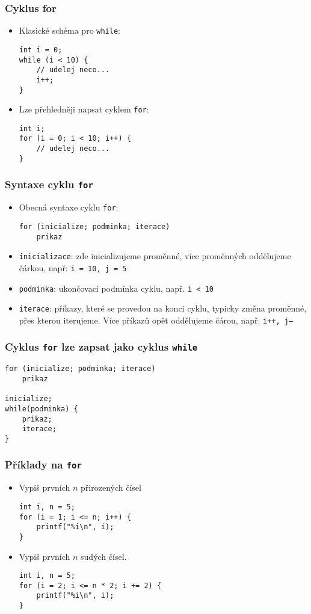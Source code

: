 \documentclass{beamer}
\newenvironment{itemizex}%
  {\large \begin{itemize}%
    \setlength{\itemsep}{8pt}%
    \setlength{\parskip}{8pt}}%
  {\end{itemize}}
\begin{document}
\begin{frame}[t,fragile]\frametitle{Cyklus for} 
  \begin{itemizex}
    \item Klasické schéma pro \texttt{while}:
    \begin{verbatim} 
int i = 0;
while (i < 10) {
    // udelej neco...
    i++;
}
    \end{verbatim}
    \item Lze přehledněji napsat cyklem \texttt{for}:
    \begin{verbatim} 
int i;
for (i = 0; i < 10; i++) {
    // udelej neco...
}
    \end{verbatim}
  \end{itemizex}
\end{frame}


\begin{frame}[t,fragile]\frametitle{Syntaxe cyklu \texttt{for}} 
  \begin{itemizex}
    \item Obecná syntaxe cyklu \texttt{for}:
    \begin{verbatim} 
for (inicialize; podminka; iterace)
    prikaz
    \end{verbatim}
    \item \texttt{inicializace}: zde inicializujeme proměnné, více proměnných oddělujeme čárkou, např: \texttt{i = 10, j = 5}
    \item \texttt{podminka}: ukončovací podmínka cyklu, např. \texttt{i < 10}
    \item \texttt{iterace}: příkazy, které se provedou na konci cyklu, typicky změna proměnné, přes kterou iterujeme. Více příkazů opět oddělujeme čárou, např. \texttt{i++, j--}
  \end{itemizex}
\end{frame}


\begin{frame}[t,fragile]\frametitle{Cyklus \texttt{for} lze zapsat jako cyklus \texttt{while}} 
\begin{verbatim} 
for (inicialize; podminka; iterace)
    prikaz

inicialize;
while(podminka) {
    prikaz;
    iterace;
}
\end{verbatim}
\end{frame}


\begin{frame}[t,fragile]\frametitle{Příklady na \texttt{for}}
  \begin{itemizex}
    \item Vypiš prvních $n$ přirozených čísel
\begin{verbatim} 
int i, n = 5;
for (i = 1; i <= n; i++) {
    printf("%i\n", i);
}
\end{verbatim}
  \item Vypiš prvních $n$ sudých čísel.
\begin{verbatim} 
int i, n = 5;
for (i = 2; i <= n * 2; i += 2) {
    printf("%i\n", i);
}
\end{verbatim}
  \end{itemizex}
\end{frame}
\end{document}
